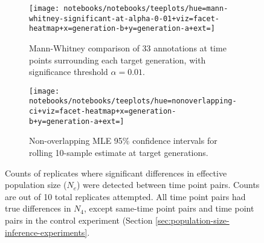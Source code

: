 \begin{figure}
  \centering

  \begin{subfigure}{\textwidth}
    \begin{minipage}{0.7\textwidth}
      \texttt{[image: notebooks/notebooks/teeplots/hue=mann-whitney-significant-at-alpha-0-01+viz=facet-heatmap+x=generation-b+y=generation-a+ext=]}
    \end{minipage}%
    \begin{minipage}{0.25\textwidth}
      \caption{Mann-Whitney comparison of 33 annotations at time points surrounding each target generation, with significance threshold $\alpha = 0.01$.}
      \label{fig:ne-detection-matrix:mann-whitney}
    \end{minipage}
  \end{subfigure}

  \vspace{1em} %

  \begin{subfigure}{\textwidth}
    \begin{minipage}{0.7\textwidth}
      \texttt{[image: notebooks/notebooks/teeplots/hue=nonoverlapping-ci+viz=facet-heatmap+x=generation-b+y=generation-a+ext=]}
    \end{minipage}%
    \begin{minipage}{0.25\textwidth}
      \caption{Non-overlapping MLE 95\% confidence intervals for rolling 10-sample estimate at target generations.}
      \label{fig:ne-detection-matrix:ci}
    \end{minipage}
  \end{subfigure}

  \caption{Counts of replicates where significant differences in effective population size ($N_e$) were detected between time point pairs.
  Counts are out of 10 total replicates attempted.
  All time point pairs had true differences in $N_4$, except same-time point pairs and time point pairs in the control experiment (Section \ref{sec:population-size-inference-experiments}.
  }
  \label{fig:ne-detection-matrix}
\end{figure}

%
